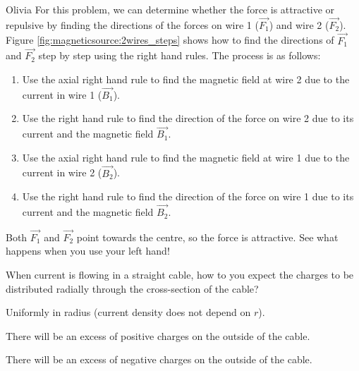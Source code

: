 \begin{studentOpinion}{Olivia}
For this problem, we can determine whether the force is attractive or repulsive by finding the directions of  the forces on wire 1 ($\vec{F_1}$) and wire 2 ($\vec{F_2}$). Figure \ref{fig:magneticsource:2wires_steps} shows how to find the directions of $\vec{F_1}$ and $\vec{F_2}$ step by step using the right hand rules. The process is as follows: 
\begin{enumerate}[label=(\alph*)]
\item Use the axial right hand rule to find the magnetic field at wire 2 due to the current in wire 1 ($\vec{B_1}$).
\item Use the right hand rule to find the direction of the force on wire 2 due to its current and the magnetic field $\vec{B_1}$. 
\item Use the axial right hand rule to find the magnetic field at wire 1 due to the current in wire 2 ($\vec{B_2}$).
\item Use the right hand rule to find the direction of the force on wire 1 due to its current and the magnetic field $\vec{B_2}$. 
\end{enumerate}
Both $\vec{F_1}$ and $\vec{F_2}$ point towards the centre, so the force is attractive. See what happens when you use your left hand!
\end{studentOpinion}

\begin{checkpoint}{}
	\begin{MCquestion}{When current is flowing in a straight cable, how to you expect the charges to be distributed radially through the cross-section of the cable?}
		\item Uniformly in radius (current density does not depend on $r$).
		\item There will be an excess of positive charges on the outside of the cable. \correct
		\item There will be an excess of negative charges on the outside of the cable.
	\end{MCquestion}
\end{checkpoint}
